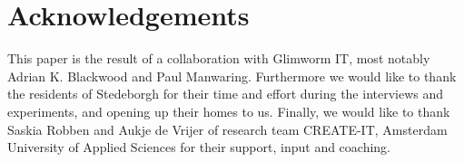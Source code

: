 \documentclass{below-ext}
\begin{document}
\section{Acknowledgements}

This paper is the result of a collaboration with Glimworm IT, most notably Adrian K. Blackwood and Paul Manwaring. Furthermore we would like to thank the residents of Stedeborgh for their time and effort during the interviews and experiments, and opening up their homes to us. Finally, we would like to thank Saskia Robben and Aukje de Vrijer of research team CREATE-IT, Amsterdam University of Applied Sciences for their support, input and coaching.

\nocite{Kanis:2013:SMH:2534504.2534526}
\nocite{Robben:2013:LRA:2534504.2534555}
\nocite{NaitAicha:2013:LYG:2494091.2497283}
\nocite{stedeborgh}
\nocite{Nehmer:2006:LAS:1134285.1134293}
\balance


\end{document}
